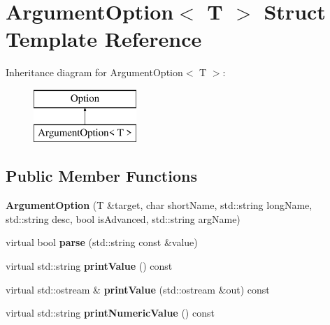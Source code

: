 \hypertarget{structArgumentOption}{}\section{Argument\+Option$<$ T $>$ Struct Template Reference}
\label{structArgumentOption}
Inheritance diagram for Argument\+Option$<$ T $>$\+:\begin{figure}[H]
\begin{center}
\leavevmode
\includegraphics[height=2.000000cm]{structArgumentOption}
\end{center}
\end{figure}
\subsection*{Public Member Functions}
\begin{DoxyCompactItemize}
\item 
\mbox{\label{structArgumentOption_a051ac7f22b3591bfdabfa347952c1fa4}} 
{\bfseries Argument\+Option} (T \&target, char short\+Name, std\+::string long\+Name, std\+::string desc, bool is\+Advanced, std\+::string arg\+Name)
\item 
\mbox{\label{structArgumentOption_a61c815060a989d83138baa69906179f9}} 
virtual bool {\bfseries parse} (std\+::string const \&value)
\item 
\mbox{\label{structArgumentOption_a6ea05167ecb1c68a7387063aac7467a0}} 
virtual std\+::string {\bfseries print\+Value} () const
\item 
\mbox{\label{structArgumentOption_a7d25840f6fba5cffeaca0e38c0e520b5}} 
virtual std\+::ostream \& {\bfseries print\+Value} (std\+::ostream \&out) const
\item 
\mbox{\label{structArgumentOption_aa8b12bae1a56a61607da5ce498e17912}} 
virtual std\+::string {\bfseries print\+Numeric\+Value} () const
\end{DoxyCompactItemize}
